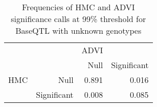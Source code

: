 \begin{table}[ht]
\centering
\caption{Frequencies of HMC and ADVI significance calls at 99\% threshold for BaseQTL with unknown genotypes} 
\label{tab:noGT-xtab-prop-99}
\begin{tabular}{rr|rr}
   &  & ADVI &  \\ 
    &   & Null & Significant \\ 
   \hline
HMC & Null & 0.891 & 0.016 \\ 
    & Significant & 0.008 & 0.085 \\ 
  \end{tabular}
\end{table}
